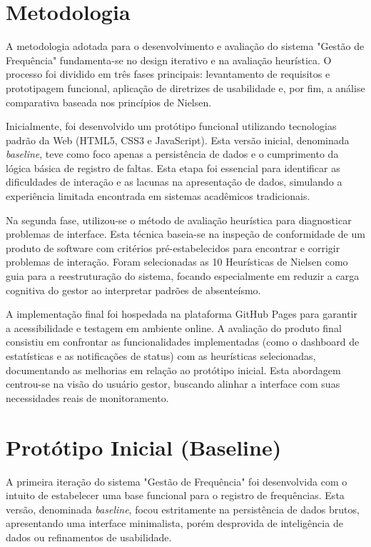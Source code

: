 \documentclass[12pt]{article}
\begin{document}
\section{Metodologia}

A metodologia adotada para o desenvolvimento e avaliação do sistema "Gestão de Frequência" fundamenta-se no design iterativo e na avaliação heurística. 
O processo foi dividido em três fases principais: levantamento de requisitos e prototipagem funcional, aplicação de diretrizes de usabilidade e, 
por fim, a análise comparativa baseada nos princípios de Nielsen.

Inicialmente, foi desenvolvido um protótipo funcional utilizando tecnologias padrão da Web (HTML5, CSS3 e JavaScript). 
Esta versão inicial, denominada \textit{baseline}, teve como foco apenas a persistência de dados e o cumprimento da lógica básica de registro de faltas.
Esta etapa foi essencial para identificar as dificuldades de interação e as lacunas na apresentação de dados, 
simulando a experiência limitada encontrada em sistemas acadêmicos tradicionais\cite{winckler}.

Na segunda fase, utilizou-se o método de avaliação heurística para diagnosticar problemas de interface. 
Esta técnica baseia-se na inspeção de conformidade de um produto de software com critérios pré-estabelecidos 
para encontrar e corrigir problemas de interação\cite{rocha}. Foram selecionadas as 10 Heurísticas de Nielsen 
como guia para a reestruturação do sistema, focando especialmente em reduzir a carga cognitiva do gestor ao interpretar padrões de absenteísmo.

A implementação final foi hospedada na plataforma GitHub Pages para garantir a acessibilidade e testagem em ambiente online. 
A avaliação do produto final consistiu em confrontar as funcionalidades implementadas (como o dashboard de estatísticas e 
as notificações de status) com as heurísticas selecionadas, documentando as melhorias em relação ao protótipo inicial. 
Esta abordagem centrou-se na visão do usuário gestor, buscando alinhar a interface com suas necessidades reais de monitoramento\cite{rocha}.

\section{Protótipo Inicial (Baseline)}

A primeira iteração do sistema "Gestão de Frequência" foi desenvolvida com o intuito de estabelecer uma base funcional 
para o registro de frequências. Esta versão, denominada \textit{baseline}, focou estritamente na persistência de dados brutos, 
apresentando uma interface minimalista, porém desprovida de inteligência de dados ou refinamentos de usabilidade.
\end{document}

